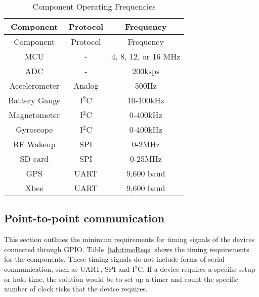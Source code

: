 \begin{center}
    \begin{longtable}{|c|c|c|}
    \caption{Component Operating Frequencies  \label{tab:compFreq}} \\
     \hline
    \rowcolor{Gray}
   Component & Protocol & Frequency \\
    \hline \hline \endfirsthead
    
         \hline
    \rowcolor{Gray}
    Component & Protocol & Frequency\\
    \hline \hline \endhead
    
    \endfoot
    MCU   & -     & 4, 8, 12, or 16 MHz \\ \hline
    ADC   & -     & 200ksps \\ \hline %
    Accelerometer & Analog & 500Hz \\ \hline
    Battery Gauge & I$^2$C & 10-100kHz \\ \hline
    Magnetometer & I$^2$C & 0-400kHz \\ \hline
    Gyroscope & I$^2$C   & 0-400kHz \\ \hline
    RF Wakeup & SPI   & 0-2MHz \\ \hline
    SD card & SPI   & 0-25MHz \\ \hline
    GPS   & UART  & 9,600 baud \\ \hline
    Xbee  & UART   & 9,600 baud \\ \hline
    \end{longtable}%

\end{center}%
  \vspace{-2cm}
  
  
  
\subsection{Point-to-point communication}
This section outlines the minimum requirements for timing signals of the devices connected through GPIO. Table~\ref{tab:timeReqs} shows the timing requirements for the components. These timing signals do not include forms of serial communication, such as UART, SPI and I$^2$C. If a device requires a specific setup or hold time, the solution would be to set up a timer and count the specific number of clock ticks that the device requires. 



